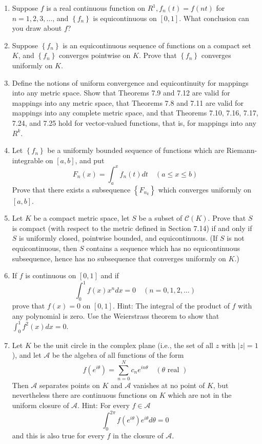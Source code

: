 \documentclass[10pt]{article}
\begin{document}
\begin{enumerate}
  (This simple example of a so-called ``space-filling curve'' is due to I. J. Schoenberg, Bull. A.M.S., vol. 44, 1938, pp. 519.)

  \item Suppose $f$ is a real continuous function on $R^{1}, f_{n}(t)=f(n t)$ for $n=1,2,3, \ldots$, and $\left\{f_{n}\right\}$ is equicontinuous on $[0,1]$. What conclusion can you draw about $f$?

  \item Suppose $\left\{f_{n}\right\}$ is an equicontinuous sequence of functions on a compact set $K$, and $\left\{f_{n}\right\}$ converges pointwise on $K$. Prove that $\left\{f_{n}\right\}$ converges uniformly on $K$.

  \item Define the notions of uniform convergence and equicontinuity for mappings into any metric space. Show that Theorems 7.9 and 7.12 are valid for mappings into any metric space, that Theorems 7.8 and 7.11 are valid for mappings into any complete metric space, and that Theorems 7.10, 7.16, 7.17, 7.24, and 7.25 hold for vector-valued functions, that is, for mappings into any $R^{k}$.

  \item Let $\left\{f_{n}\right\}$ be a uniformly bounded sequence of functions which are Riemann-integrable on $[a, b]$, and put
  $$
  F_{n}(x)=\int_{a}^{x} f_{n}(t) d t \quad(a \leq x \leq b)
  $$
  Prove that there exists a subsequence $\left\{F_{n_{k}}\right\}$ which converges uniformly on $[a, b]$.

  \item Let $K$ be a compact metric space, let $S$ be a subset of $\mathscr{C}(K)$. Prove that $S$ is compact (with respect to the metric defined in Section 7.14) if and only if $S$ is uniformly closed, pointwise bounded, and equicontinuous. (If $S$ is not equicontinuous, then $S$ contains a sequence which has no equicontinuous subsequence, hence has no subsequence that converges uniformly on $K$.)

  \item If $f$ is continuous on $[0,1]$ and if
  $$
  \int_{0}^{1} f(x) x^{n} d x=0 \quad(n=0,1,2, \ldots)
  $$
  prove that $f(x)=0$ on $[0,1]$. Hint: The integral of the product of $f$ with any polynomial is zero. Use the Weierstrass theorem to show that $\int_{0}^{1} f^{2}(x) d x=0$.

  \item Let $K$ be the unit circle in the complex plane (i.e., the set of all $z$ with $|z|=1$), and let $\mathscr{A}$ be the algebra of all functions of the form
  $$
  f\left(e^{i \theta}\right)=\sum_{n=0}^{N} c_{n} e^{i n \theta} \quad(\theta \text { real })
  $$
  Then $\mathscr{A}$ separates points on $K$ and $\mathscr{A}$ vanishes at no point of $K$, but nevertheless there are continuous functions on $K$ which are not in the uniform closure of $\mathscr{A}$. Hint: For every $f \in \mathscr{A}$
  $$
  \int_{0}^{2 \pi} f\left(e^{i \theta}\right) e^{i \theta} d \theta=0
  $$
  and this is also true for every $f$ in the closure of $\mathscr{A}$.


\end{enumerate}
\end{document}
